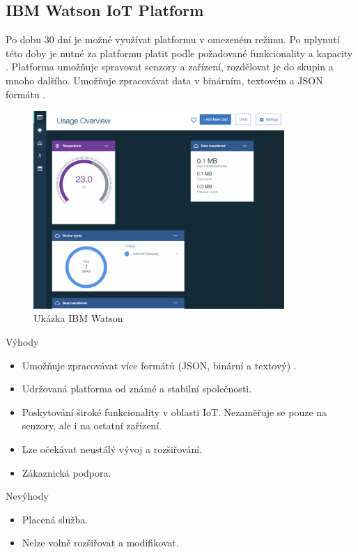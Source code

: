 \documentclass[thesis=M,czech]{FITthesis}[2018/10/20]
\begin{document}
\subsection{IBM Watson IoT Platform}
Po dobu 30 dní je možné využívat platformu v omezeném režimu. Po uplynutí této doby je nutné za platformu platit podle požadované funkcionality a kapacity \cite{ibm}. Platforma umožňuje spravovat senzory a zařízení, rozdělovat je do skupin a mnoho dalšího. Umožňuje zpracovávat data v binárním, textovém a JSON formátu \cite{ibm-format}. 

\begin{figure}[H]
\caption{Ukázka IBM Watson}
\centering
\includegraphics[width=0.85\textwidth]{ibm-temperature}
\end{figure}

\bigbreak
\newpage
Výhody
\begin{itemize}
 \item Umožňuje zpracovávat více formátů (JSON, binární a textový) \cite{ibm-format}.
 \item Udržovaná platforma od známé a stabilní společnosti.
 \item Poskytování široké funkcionality v oblasti IoT. Nezaměřuje se pouze na senzory, ale i na ostatní zařízení.
 \item Lze očekávat neustálý vývoj a rozšiřování.
 \item Zákaznická podpora.
\end{itemize}
\bigbreak
Nevýhody
\begin{itemize}
 \item Placená služba.
 \item Nelze volně rozšiřovat a modifikovat.
\end{itemize}
\end{document}
